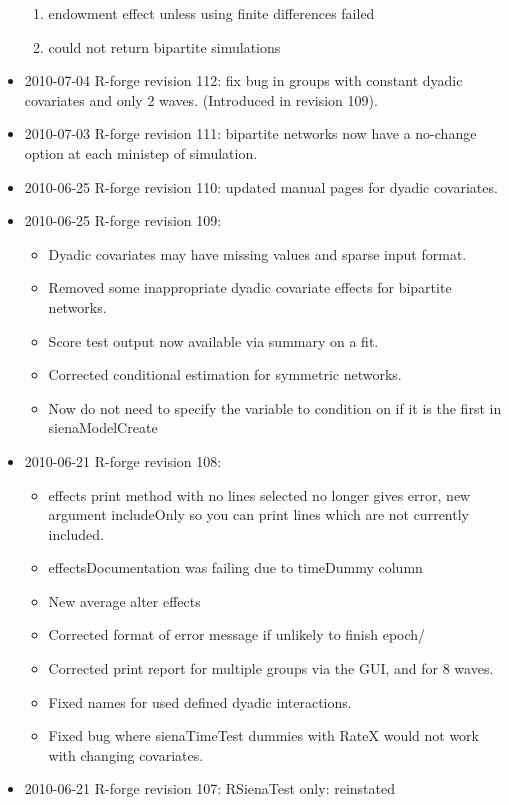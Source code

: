 \documentclass[a4paper,fleqn,11pt]{article}
\newcommand{\+}{\, + \,}
\newcommand{\sfn}[1]{\textsf{#1}}
\begin{document}
\begin{small}
\begin{itemize}
\begin{enumerate}
\item endowment effect unless using finite differences failed
\item could not return bipartite simulations
\end{enumerate}
\item 2010-07-04 R-forge revision 112: fix bug in groups with constant dyadic
  covariates and only 2 waves. (Introduced in revision 109).
\item 2010-07-03 R-forge revision 111: bipartite networks now have a no-change
  option at each ministep of simulation.
\item 2010-06-25 R-forge revision 110: updated manual pages for dyadic
  covariates.
\item 2010-06-25 R-forge revision 109:
\begin{itemize}
\item Dyadic covariates may have missing values and sparse input format.
\item Removed some inappropriate dyadic covariate effects for bipartite
  networks.
\item Score test output now available via \textsf{summary} on a fit.
\item Corrected conditional estimation for symmetric networks.
\item Now do not need to specify the variable to condition on if it is the first
  in \sfn{sienaModelCreate}
\end{itemize}
\item 2010-06-21 R-forge revision 108:
\begin{itemize}
\item effects print method with no lines selected no longer gives error, new
  argument includeOnly so you can print lines which are not currently included.
\item effectsDocumentation was failing due to timeDummy column
\item New average alter effects
\item Corrected format of error message if unlikely to finish epoch/
\item Corrected print report for multiple groups via the GUI, and for 8 waves.
\item Fixed names for used defined dyadic interactions.
\item Fixed bug where \textsf{sienaTimeTest} dummies with RateX would not work with
  changing covariates.
\end{itemize}
\item 2010-06-21 R-forge revision 107: \textsf{RSienaTest} only: reinstated

\end{itemize}
\end{small}
\end{document}

